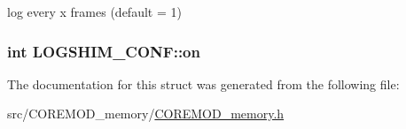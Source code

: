 log every x frames (default = 1) 

\hypertarget{structLOGSHIM__CONF_a399b782abca4a24ae8e5a3c11ac9bc48}{
\subsubsection[{on}]{\setlength{\rightskip}{0pt plus 5cm}int L\+O\+G\+S\+H\+I\+M\+\_\+\+C\+O\+N\+F\+::on}}\label{structLOGSHIM__CONF_a399b782abca4a24ae8e5a3c11ac9bc48}


The documentation for this struct was generated from the following file\+:\begin{DoxyCompactItemize}
\item 
src/\+C\+O\+R\+E\+M\+O\+D\+\_\+memory/\hyperlink{COREMOD__memory_8h}{C\+O\+R\+E\+M\+O\+D\+\_\+memory.\+h}\end{DoxyCompactItemize}
